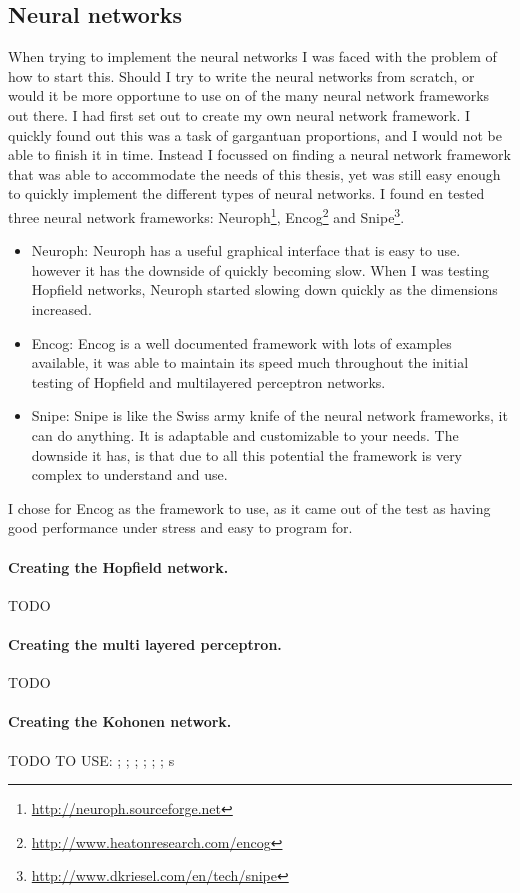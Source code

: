 \documentclass[pdftex,a4paper,12pt,twoside]{report}
\theoremstyle{plain} \newtheorem{theorem}{Theorem} \newtheorem{proposition}{Proposition} \newtheorem{lemma}{Lemma} \newtheorem*{corollary}{Corollary}
\theoremstyle{definition} \newtheorem{definition}{Definition} \newtheorem{conjecture}{Conjecture} \newtheorem*{example}{Example} \newtheorem{algorithm}{Algorithm}
\theoremstyle{remark} \newtheorem*{remark}{Remark} \newtheorem*{note}{Note} \newtheorem{case}{Case}
\begin{document}
\subsection{Neural networks}
When trying to implement the neural networks I was faced with the problem of how to start this. Should I try to write the neural networks from scratch, or would it be more opportune to use on of the many neural network frameworks out there. I had first set out to create my own neural network framework. I quickly found out this was a task of gargantuan proportions, and I would not be able to finish it in time. Instead I focussed on finding a neural network framework that was able to accommodate the needs of this thesis, yet was still easy enough to quickly implement the different types of neural networks. I found en tested three neural network frameworks: Neuroph\footnote{\url{http://neuroph.sourceforge.net}}, Encog\footnote{\url{http://www.heatonresearch.com/encog}} and Snipe\footnote{\url{http://www.dkriesel.com/en/tech/snipe}}.
\begin{itemize}
\item Neuroph: Neuroph has a useful graphical interface that is easy to use. however it has the downside of quickly becoming slow. When I was testing Hopfield networks, Neuroph started slowing down quickly as the dimensions increased.
\item Encog: Encog is a well documented framework with lots of examples available, it was able to maintain its speed much throughout the initial testing of Hopfield and multilayered perceptron networks.
\item Snipe: Snipe is like the Swiss army knife of the neural network frameworks, it can do anything. It is adaptable and customizable to your needs. The downside it has, is that due to all this potential the framework is very complex to understand and use.
\end{itemize}
I chose for Encog as the framework to use, as it came out of the test as having good performance under stress and easy to program for.
\paragraph{Creating the Hopfield network.}
TODO
\paragraph{Creating the multi layered perceptron.}
TODO
\paragraph{Creating the Kohonen network.}
TODO
TO USE: \citep{Browning2007}; \citep{Chellapilla2005}; \citep{Fletcher2009}; \citep{Gang}; \citep{Jiang2003}; \citep{SathasivamSaratha2011}; \citep{Torma1995}s
\end{document}
